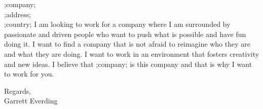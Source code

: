 \documentclass[11pt]{letter} %
\begin{document}
\begin{letter}{
		;company; \\
		;address; \\
		;country; }
I am looking to work for a company where I am surrounded by passionate and driven people who want to push what is possible and have fun doing it. I want to find a company that is not afraid to reimagine who they are and what they are doing. I want to work in an environment that fosters creativity and new ideas. I believe that ;company; is this company and that is why I want to work for you.

Regards, \\

Garrett Everding




\end{letter}
\end{document}

